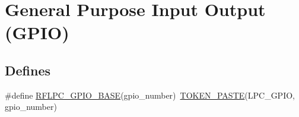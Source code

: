 \hypertarget{group__gpio}{\section{General Purpose Input Output (G\-P\-I\-O)}
\label{group__gpio}
}
\subsection*{Defines}
\begin{DoxyCompactItemize}
\item 
\hypertarget{group__gpio_ga77a6978d3b35080d5c7712e376e94932}{\#define \hyperlink{group__gpio_ga77a6978d3b35080d5c7712e376e94932}{R\-F\-L\-P\-C\-\_\-\-G\-P\-I\-O\-\_\-\-B\-A\-S\-E}(gpio\-\_\-number)~\hyperlink{tools_8h_a5d9ce08df204e6d48704ec89fb62ebd7}{T\-O\-K\-E\-N\-\_\-\-P\-A\-S\-T\-E}(L\-P\-C\-\_\-\-G\-P\-I\-O, gpio\-\_\-number)}\label{group__gpio_ga77a6978d3b35080d5c7712e376e94932}


\end{DoxyCompactItemize}
